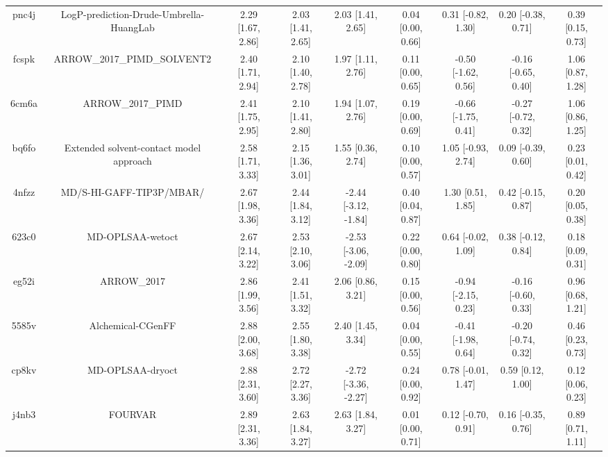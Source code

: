 \documentclass{article}
\begin{document}
\begin{center}
\begin{longtable}{|ccccccccc|}
 pnc4j &            LogP-prediction-Drude-Umbrella-HuangLab &  2.29 [1.67, 2.86] &  2.03 [1.41, 2.65] &     2.03 [1.41, 2.65] &  0.04 [0.00, 0.66] &   0.31 [-0.82, 1.30] &   0.20 [-0.38, 0.71] &     0.39 [0.15, 0.73] \\
 fcspk &                        ARROW\_2017\_PIMD\_SOLVENT2 &  2.40 [1.71, 2.94] &  2.10 [1.40, 2.78] &     1.97 [1.11, 2.76] &  0.11 [0.00, 0.65] &  -0.50 [-1.62, 0.56] &  -0.16 [-0.65, 0.40] &     1.06 [0.87, 1.28] \\
 6cm6a &                                  ARROW\_2017\_PIMD &  2.41 [1.75, 2.95] &  2.10 [1.41, 2.80] &     1.94 [1.07, 2.76] &  0.19 [0.00, 0.69] &  -0.66 [-1.75, 0.41] &  -0.27 [-0.72, 0.32] &     1.06 [0.86, 1.25] \\
 bq6fo &            Extended solvent-contact model approach &  2.58 [1.71, 3.33] &  2.15 [1.36, 3.01] &     1.55 [0.36, 2.74] &  0.10 [0.00, 0.57] &   1.05 [-0.93, 2.74] &   0.09 [-0.39, 0.60] &     0.23 [0.01, 0.42] \\
 4nfzz &                           MD/S-HI-GAFF-TIP3P/MBAR/ &  2.67 [1.98, 3.36] &  2.44 [1.84, 3.12] &  -2.44 [-3.12, -1.84] &  0.40 [0.04, 0.87] &    1.30 [0.51, 1.85] &   0.42 [-0.15, 0.87] &     0.20 [0.05, 0.38] \\
 623c0 &                                   MD-OPLSAA-wetoct &  2.67 [2.14, 3.22] &  2.53 [2.10, 3.06] &  -2.53 [-3.06, -2.09] &  0.22 [0.00, 0.80] &   0.64 [-0.02, 1.09] &   0.38 [-0.12, 0.84] &     0.18 [0.09, 0.31] \\
 eg52i &                                        ARROW\_2017 &  2.86 [1.99, 3.56] &  2.41 [1.51, 3.32] &     2.06 [0.86, 3.21] &  0.15 [0.00, 0.56] &  -0.94 [-2.15, 0.23] &  -0.16 [-0.60, 0.33] &     0.96 [0.68, 1.21] \\
 5585v &                                  Alchemical-CGenFF &  2.88 [2.00, 3.68] &  2.55 [1.80, 3.38] &     2.40 [1.45, 3.34] &  0.04 [0.00, 0.55] &  -0.41 [-1.98, 0.64] &  -0.20 [-0.74, 0.32] &     0.46 [0.23, 0.73] \\
 cp8kv &                                   MD-OPLSAA-dryoct &  2.88 [2.31, 3.60] &  2.72 [2.27, 3.36] &  -2.72 [-3.36, -2.27] &  0.24 [0.00, 0.92] &   0.78 [-0.01, 1.47] &    0.59 [0.12, 1.00] &     0.12 [0.06, 0.23] \\
 j4nb3 &                                            FOURVAR &  2.89 [2.31, 3.36] &  2.63 [1.84, 3.27] &     2.63 [1.84, 3.27] &  0.01 [0.00, 0.71] &   0.12 [-0.70, 0.91] &   0.16 [-0.35, 0.76] &     0.89 [0.71, 1.11] \\

\end{longtable}
\end{center}
\end{document}
